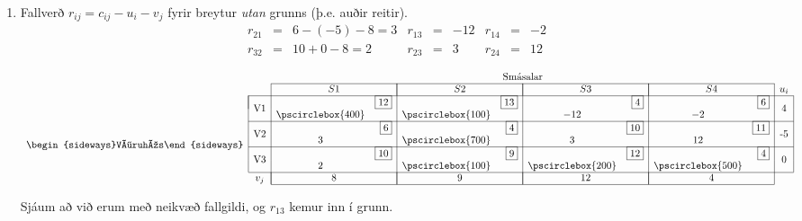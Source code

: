 \begin{lausn}
\begin{description}
\begin{enumerate}
\item Fallverð $r_{ij}=c_{ij}-u_i-v_j$ fyrir breytur \emph{utan} grunns (þ.e. auðir reitir).
\[\begin{matrix}   r_{21}&=&6-(-5)-8=3 &  r_{13}&=&-12  & r_{14}&=&-2\\ 
                   r_{32}&=&10+0-8=2  &   r_{23}&=&3 & r_{24}&=&12  \end{matrix}\] 
\begin{center}
\[ \begin{array}{cccr|cr|cr|crcc}
 & & \multicolumn{8}{c}{\mbox{Smásalar}} \\ \cline{3-10}
 & & \multicolumn{2}{|c|}{S1} & \multicolumn{2}{|c|}{S2} & \multicolumn{2}{|c|}{S3}& \multicolumn{2}{|c|}{S4} &  u_i \\ \cline{2-11}
\multicolumn{1}{c|}{\multirow{8}{*}{\begin{sideways}Vöruhús\end{sideways}}} 
& \multicolumn{1}{|c|}{\multirow{2}{*}{V1}} &   & \scriptscriptstyle{\fbox{12}}&    & \scriptscriptstyle{\fbox{13}} & & \scriptscriptstyle{\fbox{4}}& & \scriptscriptstyle{\fbox{6}} & \multicolumn{1}{|c|}{\multirow{2}{*}{4}}  \\ 
& \multicolumn{1}{|c|}{} & \pscirclebox{400} & & \pscirclebox{100}&    & -12 & & -2 & & \multicolumn{1}{|c|}{}\\ \cline{2-11}
& \multicolumn{1}{|c|}{\multirow{2}{*}{V2}} &   & \scriptscriptstyle{\fbox{6}}&    & \scriptscriptstyle{\fbox{4}} & & \scriptscriptstyle{\fbox{10}}& & \scriptscriptstyle{\fbox{11}} & \multicolumn{1}{|c|}{\multirow{2}{*}{-5}}  \\ 
& \multicolumn{1}{|c|}{} & 3 &    & \pscirclebox{700}&    & 3 & & 12 &   & \multicolumn{1}{|c|}{}\\ \cline{2-11}
& \multicolumn{1}{|c|}{\multirow{2}{*}{V3}} &   & \scriptscriptstyle{\fbox{10}}&    & \scriptscriptstyle{\fbox{9}} &  & \scriptscriptstyle{\fbox{12}} & & \scriptscriptstyle{\fbox{4}} & \multicolumn{1}{|c|}{\multirow{2}{*}{0}} \\ 
& \multicolumn{1}{|c|}{} & 2  &    & \pscirclebox{100}&    & \pscirclebox{200}&   & \pscirclebox{500}& & \multicolumn{1}{|c|}{\multirow{2}{*}{}}\\ \cline{2-11}
&  \multicolumn{1}{c|}{v_j}& \multicolumn{2}{|c|}{8} & \multicolumn{2}{|c|}{9} & \multicolumn{2}{|c|}{12} &\multicolumn{2}{|c|}{4} & \\ \cline{3-10}
\end{array}
\]
\end{center}
Sjáum að við erum með neikvæð fallgildi, og $r_{13}$ kemur inn í grunn.

\end{enumerate}
\end{description}
\end{lausn}

